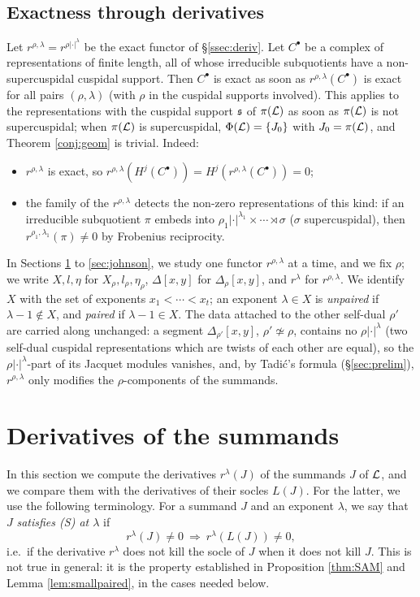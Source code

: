 \documentclass[a4paper,12pt,leqno]{amsart}
\theoremstyle{plain}
\theoremstyle{definition}
\begin{document}
\subsection{Exactness through derivatives}
Let $r^{\rho,\lambda}=r^{\rho|\cdot|^\lambda}$ be the exact functor of \S\ref{ssec:deriv}. Let $C^\bullet$ be a complex of
representations of finite length, all of whose irreducible subquotients have a non-supercuspidal
cuspidal support. Then $C^\bullet$ is exact as soon as $r^{\rho,\lambda}(C^\bullet)$ is exact for all
pairs $(\rho,\lambda)$ (with $\rho$ in the cuspidal supports involved). This applies to the
representations with the cuspidal support $\mathfrak{s}$ of $\pi(\mathcal{L})$ as soon as $\pi(\mathcal{L})$ is not
supercuspidal; when $\pi(\mathcal{L})$ is supercuspidal, $\Phi(\mathcal{L})=\{J_0\}$ with $J_0=\pi(\mathcal{L})$, and Theorem
\ref{conj:geom} is trivial. Indeed:
\begin{itemize}
\item $r^{\rho,\lambda}$ is exact, so $r^{\rho,\lambda}(H^j(C^\bullet))=H^j(r^{\rho,\lambda}(C^\bullet))=0$;
\item the family of the $r^{\rho,\lambda}$ detects the non-zero representations of this kind: if an
irreducible subquotient $\pi$ embeds into $\rho_1|\cdot|^{\lambda_1}\times\cdots\rtimes\sigma$ ($\sigma$
supercuspidal), then $r^{\rho_1,\lambda_1}(\pi)\neq0$ by Frobenius reciprocity.
\end{itemize}
In Sections \ref{sec:local} to \ref{sec:johnson}, we study one functor $r^{\rho,\lambda}$ at a time, and
we fix $\rho$; we write $X,l,\eta$ for $X_\rho,l_\rho,\eta_\rho$, $\Delta[x,y]$ for $\Delta_\rho[x,y]$, and
$r^\lambda$ for $r^{\rho,\lambda}$. We identify $X$ with the set of exponents $x_1<\cdots<x_t$; an exponent
$\lambda\in X$ is \emph{unpaired} if $\lambda-1\notin X$, and \emph{paired} if $\lambda-1\in X$. The data attached to the other self-dual $\rho'$ are carried along
unchanged: a segment $\Delta_{\rho'}[x,y]$, $\rho'\not\simeq\rho$, contains no $\rho|\cdot|^\lambda$ (two
self-dual cuspidal representations which are twists of each other are equal), so the
$\rho|\cdot|^\lambda$-part of its Jacquet modules vanishes, and, by Tadi\'c's formula
(\S\ref{sec:prelim}), $r^{\rho,\lambda}$ only modifies the $\rho$-components of the summands.

\section{Derivatives of the summands}\label{sec:local}
In this section we compute the derivatives $r^\lambda(J)$ of the summands $J$ of $\mathcal{L}$, and we compare
them with the derivatives of their socles $L(J)$. For the latter, we use the following terminology. For
a summand $J$ and an exponent $\lambda$, we say that $J$ \emph{satisfies (S) at $\lambda$} if
\[r^\lambda(J)\neq0\ \Longrightarrow\ r^\lambda(L(J))\neq0,\]
i.e.\ if the derivative $r^\lambda$ does not kill the socle of $J$ when it does not kill $J$. This is not
true in general: it is the property established in Proposition \ref{thm:SAM}
and Lemma \ref{lem:smallpaired}, in the cases needed below.
\end{document}
